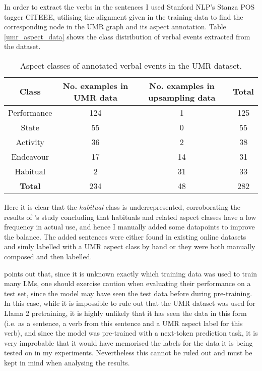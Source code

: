 In order to extract the verbs in the sentences I used Stanford NLP's Stanza POS tagger CITEEE, utilising the alignment given in the training data to find the corresponding node in the UMR graph and its aspect annotation. Table \ref*{umr_aspect_data} shows the class distribution of verbal events extracted from the dataset.
\begin{table}
    \centering
    \begin{tabular}{|c|c|c|c|}
        Class & No. examples in UMR data & No. examples in upsampling data & \textbf{Total} \\ \hline
        Performance & 124 & 1 & 125\\
        State & 55 & 0 & 55\\
        Activity & 36 & 2 & 38\\
        Endeavour & 17 & 14 & 31\\
        Habitual & 2 & 31 & 33\\ \hline
        \textbf{Total} & 234 & 48 & 282
    \end{tabular}
    \caption{Aspect classes of annotated verbal events in the UMR dataset.}
\end{table}
\label{umr_aspect_data}

Here it is clear that the \emph{habitual} class is underrepresented, corroborating the results of \citet{Dahl1985TenseAA}'s study concluding that habituals and related aspect classes have a low frequency in actual use, and hence I manually added some datapoints to improve the balance. The added sentences were either found in existing online datasets and simly labelled with a UMR aspect class by hand or they were both manually composed and then labelled.

\citet{törnberg2024best} points out that, since it is unknown exactly which training data was used to train many LMs, one should exercise caution when evaluating their performance on a test set, since the model may have seen the test data before during pre-training. In this case, while it is impossible to rule out that the UMR dataset was used for Llama 2 pretraining, it is highly unlikely that it has seen the data in this form (i.e. as a sentence, a verb from this sentence and a UMR aspect label for this verb), and since the model was pre-trained with a next-token prediction task, it is very improbable that it would have memorised the labels for the data it is being tested on in my experiments. Nevertheless this cannot be ruled out and must be kept in mind when analysing the results.

